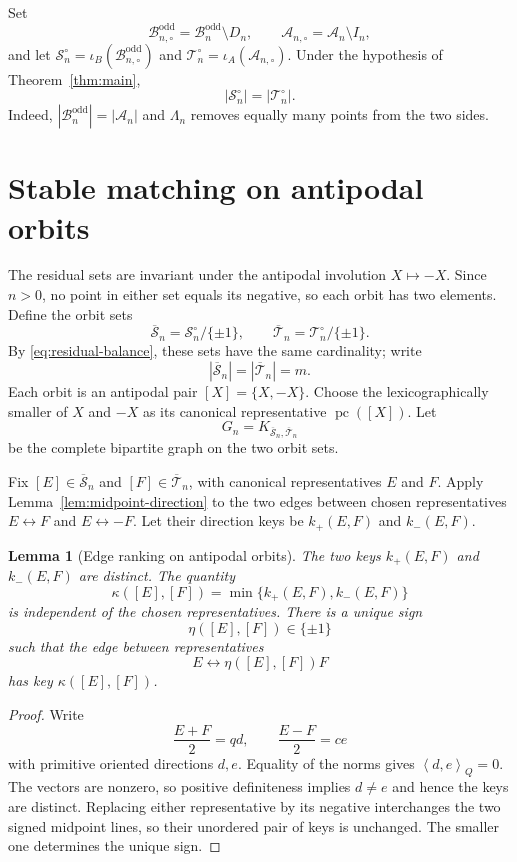 \documentclass[11pt]{amsart}
\newtheorem{lemma}[theorem]{Lemma}
\theoremstyle{definition}
\theoremstyle{remark}
\newcommand{\An}{\mathcal A_n}
\newcommand{\Bodd}{\mathcal B_n^{\mathrm{odd}}}
\newcommand{\Boddres}{\mathcal B_{n,\circ}^{\mathrm{odd}}}
\newcommand{\Ares}{\mathcal A_{n,\circ}}
\newcommand{\Sres}{\mathcal S_n^{\circ}}
\newcommand{\Tres}{\mathcal T_n^{\circ}}
\newcommand{\Sbar}{\overline{\mathcal S}_n}
\newcommand{\Tbar}{\overline{\mathcal T}_n}
\newcommand{\pc}{\operatorname{pc}}
\newcommand{\Qip}[2]{\left\langle #1,#2\right\rangle_Q}
\begin{document}
Set
\[
 \Boddres=\Bodd\setminus D_n,
 \qquad
 \Ares=\An\setminus I_n,
\]
and let $\Sres=\iota_B(\Boddres)$ and
$\Tres=\iota_A(\Ares)$.
Under the hypothesis of Theorem~\ref{thm:main},
\begin{equation}\label{eq:residual-balance}
 |\Sres|=|\Tres|.
\end{equation}
Indeed, $|\Bodd|=|\An|$ and $\Lambda_n$ removes equally many points from the
two sides.

\section{Stable matching on antipodal orbits}
\label{sec:projective}

The residual sets are invariant under the antipodal involution $X\mapsto-X$.
Since $n>0$, no point in either set equals its negative, so each orbit has
two elements.  Define the orbit sets
\[
 \Sbar=\Sres/\{\pm1\},
 \qquad
 \Tbar=\Tres/\{\pm1\}.
\]
By \eqref{eq:residual-balance}, these sets have the same cardinality; write
\[
 |\Sbar|=|\Tbar|=m.
\]
Each orbit is an antipodal pair $[X]=\{X,-X\}$.  Choose the lexicographically
smaller of $X$ and $-X$ as its canonical representative $\pc([X])$.  Let
\[
 G_n=K_{\Sbar,\Tbar}
\]
be the complete bipartite graph on the two orbit sets.

Fix $[E]\in\Sbar$ and $[F]\in\Tbar$, with canonical representatives $E$ and
$F$.  Apply Lemma~\ref{lem:midpoint-direction} to the two edges between
chosen representatives
$E\leftrightarrow F$ and $E\leftrightarrow -F$.  Let their direction keys be
$k_+(E,F)$ and $k_-(E,F)$.

\begin{lemma}[Edge ranking on antipodal orbits]\label{lem:projective-key}
The two keys $k_+(E,F)$ and $k_-(E,F)$ are distinct.  The quantity
\[
 \kappa([E],[F])=\min\{k_+(E,F),k_-(E,F)\}
\]
is independent of the chosen representatives.  There is a unique sign
\[
 \eta([E],[F])\in\{\pm1\}
\]
such that the edge between representatives
\[
 E\longleftrightarrow \eta([E],[F])F
\]
has key $\kappa([E],[F])$.
\end{lemma}

\begin{proof}
Write
\[
 \frac{E+F}{2}=qd,
 \qquad
 \frac{E-F}{2}=ce
\]
with primitive oriented directions $d,e$.  Equality of the norms gives
$\Qip{d}{e}=0$.  The vectors are nonzero, so positive definiteness implies
$d\ne e$ and hence the keys are distinct.  Replacing either representative by
its negative interchanges the two signed midpoint lines, so their unordered
pair of keys is unchanged.  The smaller one determines the unique sign.
\end{proof}
\end{document}
